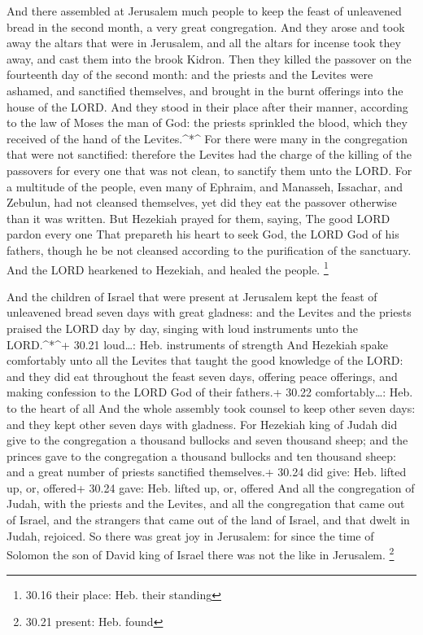  And there assembled at Jerusalem much people to keep the
feast of unleavened bread in the second month, a very great
congregation.  And they arose and took away the altars that
were in Jerusalem, and all the altars for incense took they away, and
cast them into the brook Kidron.  Then they killed the
passover on the fourteenth day of the second month: and the priests and
the Levites were ashamed, and sanctified themselves, and brought in the
burnt offerings into the house of the LORD.  And they stood
in their place after their manner, according to the law of Moses the man
of God: the priests sprinkled the blood, which they received of the hand
of the Levites.\^{}*\^{}  For there were many in the
congregation that were not sanctified: therefore the Levites had the
charge of the killing of the passovers for every one that was not clean,
to sanctify them unto the LORD.  For a multitude of the
people, even many of Ephraim, and Manasseh, Issachar, and Zebulun, had
not cleansed themselves, yet did they eat the passover otherwise than it
was written. But Hezekiah prayed for them, saying, The good LORD pardon
every one  That prepareth his heart to seek God, the LORD
God of his fathers, though he be not cleansed according to the
purification of the sanctuary.  And the LORD hearkened to
Hezekiah, and healed the people. \footnote{30.16 their place: Heb. their
  standing}

 And the children of Israel that were present at Jerusalem
kept the feast of unleavened bread seven days with great gladness: and
the Levites and the priests praised the LORD day by day, singing with
loud instruments unto the LORD.\^{}*\^{}+ 30.21 loud\ldots: Heb.
instruments of strength  And Hezekiah spake comfortably
unto all the Levites that taught the good knowledge of the LORD: and
they did eat throughout the feast seven days, offering peace offerings,
and making confession to the LORD God of their fathers.+ 30.22
comfortably\ldots: Heb. to the heart of all  And the whole
assembly took counsel to keep other seven days: and they kept other
seven days with gladness.  For Hezekiah king of Judah did
give to the congregation a thousand bullocks and seven thousand sheep;
and the princes gave to the congregation a thousand bullocks and ten
thousand sheep: and a great number of priests sanctified themselves.+
30.24 did give: Heb. lifted up, or, offered+ 30.24 gave: Heb. lifted up,
or, offered  And all the congregation of Judah, with the
priests and the Levites, and all the congregation that came out of
Israel, and the strangers that came out of the land of Israel, and that
dwelt in Judah, rejoiced.  So there was great joy in
Jerusalem: for since the time of Solomon the son of David king of Israel
there was not the like in Jerusalem. \footnote{30.21 present: Heb. found}

